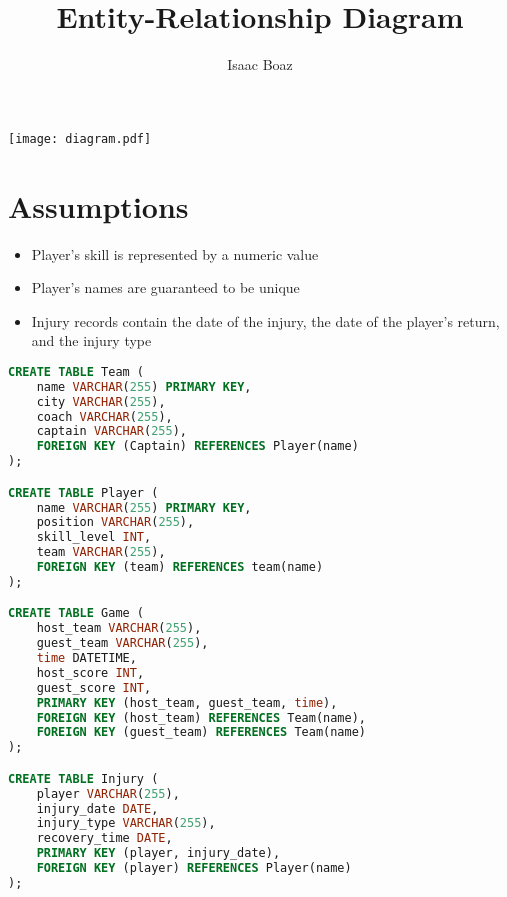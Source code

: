 \documentclass{article}
\title{\vspace{-7em}Entity-Relationship Diagram}
\author{Isaac Boaz}
\begin{document}
\hspace*{-4cm}
\texttt{[image: diagram.pdf]}

\maketitle
\section*{Assumptions}
\begin{itemize}
    \item Player's skill is represented by a numeric value
    \item Player's names are guaranteed to be unique
    \item Injury records contain the date of the injury, the date of the player's return, and the injury type
\end{itemize}

\begin{lstlisting}[language=SQL]
CREATE TABLE Team (
    name VARCHAR(255) PRIMARY KEY,
    city VARCHAR(255),
    coach VARCHAR(255),
    captain VARCHAR(255),
    FOREIGN KEY (Captain) REFERENCES Player(name)
);

CREATE TABLE Player (
    name VARCHAR(255) PRIMARY KEY,
    position VARCHAR(255),
    skill_level INT,
    team VARCHAR(255),
    FOREIGN KEY (team) REFERENCES team(name)
);

CREATE TABLE Game (
    host_team VARCHAR(255),
    guest_team VARCHAR(255),
    time DATETIME,
    host_score INT,
    guest_score INT,
    PRIMARY KEY (host_team, guest_team, time),
    FOREIGN KEY (host_team) REFERENCES Team(name),
    FOREIGN KEY (guest_team) REFERENCES Team(name)
);

CREATE TABLE Injury (
    player VARCHAR(255),
    injury_date DATE,
    injury_type VARCHAR(255),
    recovery_time DATE,
    PRIMARY KEY (player, injury_date),
    FOREIGN KEY (player) REFERENCES Player(name)
);
\end{lstlisting}
\end{document}
